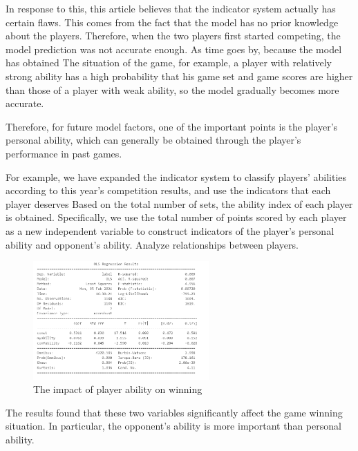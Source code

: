 \documentclass[12pt]{article}
\begin{document}
In response to this, this article believes that the indicator system actually has certain flaws. This comes from the fact that the model has no prior knowledge about the players. Therefore, when the two players first started competing, the model prediction was not accurate enough. As time goes by, because the model has obtained The situation of the game, for example, a player with relatively strong ability has a high probability that his game set and game scores are higher than those of a player with weak ability, so the model gradually becomes more accurate.

Therefore, for future model factors, one of the important points is the player's personal ability, which can generally be obtained through the player's performance in past games.

For example, we have expanded the indicator system to classify players' abilities according to this year's competition results, and use the indicators that each player deserves
Based on the total number of sets, the ability index of each player is obtained. Specifically, we use the total number of points scored by each player as a new independent variable to construct indicators of the player's personal ability and opponent's ability. Analyze relationships between players.

\begin{figure}[H]
      \centering
      \includegraphics[width=0.6\textwidth]{logisticRegression2.png}
      \caption{The impact of player ability on winning}
\end{figure}

The results found that these two variables significantly affect the game winning situation. In particular, the opponent's ability is more important than personal ability.
\end{document}
